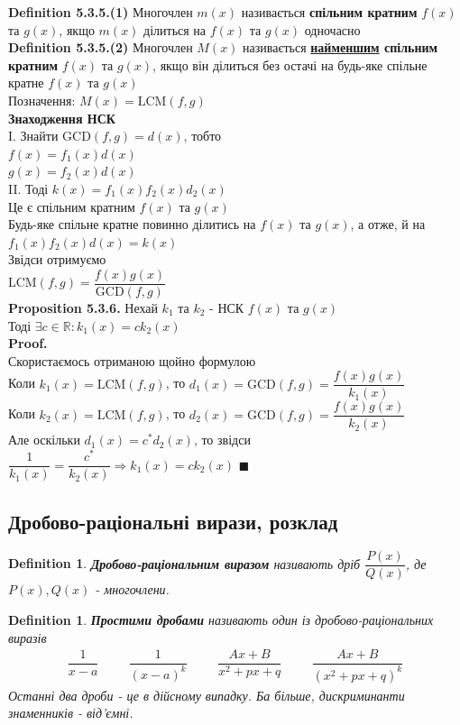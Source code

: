 \documentclass[a4paper, 10pt]{extarticle}
\def\defin#1{\textbf{Definition {#1}}}
\def\prp#1{\textbf{Proposition {#1}}}
\def\proof{\textbf{Proof.}\\}
\def\bigline{\vspace{5mm}\\}
\def\qed{$\blacksquare$}
\def\qed{$\blacksquare$}
\theoremstyle{theoremdd}
\theoremstyle{theoremdd}
\newtheorem{definition}[theorem]{Definition}
\theoremstyle{theoremdd}
\theoremstyle{theoremdd}
\theoremstyle{theoremdd}
\theoremstyle{theoremdd}
\theoremstyle{theoremdd}
\theoremstyle{theoremdd}
\begin{document}
\defin{5.3.5.(1)} Многочлен $m(x)$ називається \textbf{спільним кратним} $f(x)$ та $g(x)$, якщо $m(x)$ ділиться на $f(x)$ та $g(x)$ одночасно
\bigline
\defin{5.3.5.(2)} Многочлен $M(x)$ називається \textbf{\underline{найменшим} спільним кратним} $f(x)$ та $g(x)$, якщо він ділиться без остачі на будь-яке спільне кратне $f(x)$ та $g(x)$\\
Позначення: $M(x) = \textrm{LCM}(f,g)$
\bigline
\textbf{Знаходження НСК}\\
I. Знайти $\textrm{GCD}(f,g) = d(x)$, тобто\\
$f(x) = f_1(x) d(x)$\\
$g(x) = f_2(x) d(x)$\\
II. Тоді $k(x) = f_1(x)f_2(x)d_2(x)$\\
Це є спільним кратним $f(x)$ та $g(x)$\\
Будь-яке спільне кратне повинно ділитись на $f(x)$ та $g(x)$, а отже, й на $f_1(x)f_2(x)d(x) = k(x)$\\
Звідси отримуємо\\
$\textrm{LCM}(f,g) = \dfrac{f(x)g(x)}{\textrm{GCD}(f,g)}$
\bigline
\prp{5.3.6.} Нехай $k_1$ та $k_2$ - НСК $f(x)$ та $g(x)$\\
Тоді $\exists c \in \mathbb{R}: k_1(x) = ck_2(x)$\\
\proof
Скористаємось отриманою щойно формулою\\
Коли $k_1(x) = \textrm{LCM}(f,g)$, то $d_1(x) = \textrm{GCD}(f,g) = \dfrac{f(x)g(x)}{k_1(x)}$\\
Коли $k_2(x) = \textrm{LCM}(f,g)$, то $d_2(x) = \textrm{GCD}(f,g) = \dfrac{f(x)g(x)}{k_2(x)}$\\
Але оскільки $d_1(x) = c^*d_2(x)$, то звідси $\dfrac{1}{k_1(x)} = \dfrac{c^*}{k_2(x)} \Rightarrow k_1(x) = c k_2(x)$ \qed
\bigline
\fi

\subsection{Дробово-раціональні вирази, розклад}
\begin{definition}
\textbf{Дробово-раціональним виразом} називають дріб $\dfrac{P(x)}{Q(x)}$, де $P(x),Q(x)$ - многочлени.
\end{definition}

\begin{definition}
\textbf{Простими дробами} називають один із дробово-раціональних виразів
\begin{align*}
\dfrac{1}{x-a} \hspace{1cm} \dfrac{1}{(x-a)^k} \hspace{1cm} \dfrac{Ax+B}{x^2+px+q} \hspace{1cm} \dfrac{Ax+B}{(x^2+px+q)^k}
\end{align*}
Останні два дроби - це в дійсному випадку. Ба більше, дискриминанти знаменників - від'ємні.
\end{definition}
\end{document}
